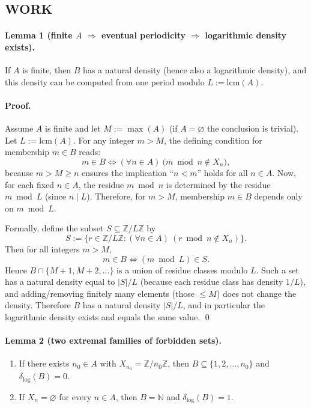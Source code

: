 \subsection*{WORK}
\paragraph{Lemma 1 (finite $A$ $\Rightarrow$ eventual periodicity $\Rightarrow$ logarithmic density exists).}
If $A$ is finite, then $B$ has a natural density (hence also a logarithmic density), and this density can be computed from one period modulo $L:=\mathrm{lcm}(A)$.

\paragraph{Proof.}
Assume $A$ is finite and let $M:=\max(A)$ (if $A=\varnothing$ the conclusion is trivial).
Let $L:=\mathrm{lcm}(A)$.
For any integer $m>M$, the defining condition for membership $m\in B$ reads:
\[m\in B \iff (\forall n\in A)\ \bigl(m\bmod n\not\in X_n\bigr),\]
because $m>M\ge n$ ensures the implication ``$n<m$'' holds for all $n\in A$.
Now, for each fixed $n\in A$, the residue $m\bmod n$ is determined by the residue $m\bmod L$ (since $n\mid L$).
Therefore, for $m>M$, membership $m\in B$ depends only on $m\bmod L$.

Formally, define the subset $S\subseteq \mathbb{Z}/L\mathbb{Z}$ by
\[S := \{ r\in \mathbb{Z}/L\mathbb{Z} : (\forall n\in A)\ (r\bmod n \not\in X_n)\}.
\]
Then for all integers $m>M$,
\[m\in B \iff (m\bmod L)\in S.
\]
Hence $B\cap\{M+1,M+2,\dots\}$ is a union of residue classes modulo $L$.
Such a set has a natural density equal to $|S|/L$ (because each residue class has density $1/L$), and adding/removing finitely many elements (those $\le M$) does not change the density.
Therefore $B$ has a natural density $|S|/L$, and in particular the logarithmic density exists and equals the same value.
\qed

\paragraph{Lemma 2 (two extremal families of forbidden sets).}
\begin{enumerate}
\item If there exists $n_0\in A$ with $X_{n_0}=\mathbb{Z}/n_0\mathbb{Z}$, then $B\subseteq\{1,2,\dots,n_0\}$ and $\delta_{\log}(B)=0$.
\item If $X_n=\varnothing$ for every $n\in A$, then $B=\mathbb{N}$ and $\delta_{\log}(B)=1$.
\end{enumerate}

